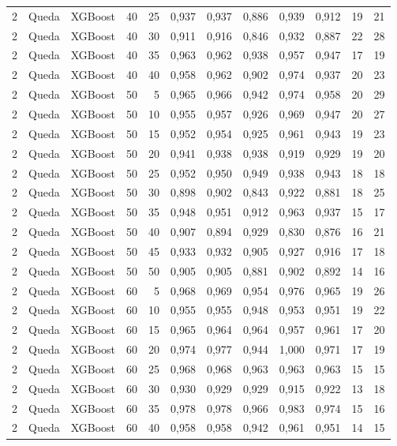\begin{longtable}{@{}rllrrrrrrrrr@{}}
2 & Queda & XGBoost & 40 & 25 & 0,937 & 0,937 & 0,886 & 0,939 & 0,912 & 19 & 21 \\
2 & Queda & XGBoost & 40 & 30 & 0,911 & 0,916 & 0,846 & 0,932 & 0,887 & 22 & 28 \\
2 & Queda & XGBoost & 40 & 35 & 0,963 & 0,962 & 0,938 & 0,957 & 0,947 & 17 & 19 \\
2 & Queda & XGBoost & 40 & 40 & 0,958 & 0,962 & 0,902 & 0,974 & 0,937 & 20 & 23 \\
2 & Queda & XGBoost & 50 & 5 & 0,965 & 0,966 & 0,942 & 0,974 & 0,958 & 20 & 29 \\
2 & Queda & XGBoost & 50 & 10 & 0,955 & 0,957 & 0,926 & 0,969 & 0,947 & 20 & 27 \\
2 & Queda & XGBoost & 50 & 15 & 0,952 & 0,954 & 0,925 & 0,961 & 0,943 & 19 & 23 \\
2 & Queda & XGBoost & 50 & 20 & 0,941 & 0,938 & 0,938 & 0,919 & 0,929 & 19 & 20 \\
2 & Queda & XGBoost & 50 & 25 & 0,952 & 0,950 & 0,949 & 0,938 & 0,943 & 18 & 18 \\
2 & Queda & XGBoost & 50 & 30 & 0,898 & 0,902 & 0,843 & 0,922 & 0,881 & 18 & 25 \\
2 & Queda & XGBoost & 50 & 35 & 0,948 & 0,951 & 0,912 & 0,963 & 0,937 & 15 & 17 \\
2 & Queda & XGBoost & 50 & 40 & 0,907 & 0,894 & 0,929 & 0,830 & 0,876 & 16 & 21 \\
2 & Queda & XGBoost & 50 & 45 & 0,933 & 0,932 & 0,905 & 0,927 & 0,916 & 17 & 18 \\
2 & Queda & XGBoost & 50 & 50 & 0,905 & 0,905 & 0,881 & 0,902 & 0,892 & 14 & 16 \\
2 & Queda & XGBoost & 60 & 5 & 0,968 & 0,969 & 0,954 & 0,976 & 0,965 & 19 & 26 \\
2 & Queda & XGBoost & 60 & 10 & 0,955 & 0,955 & 0,948 & 0,953 & 0,951 & 19 & 22 \\
2 & Queda & XGBoost & 60 & 15 & 0,965 & 0,964 & 0,964 & 0,957 & 0,961 & 17 & 20 \\
2 & Queda & XGBoost & 60 & 20 & 0,974 & 0,977 & 0,944 & 1,000 & 0,971 & 17 & 19 \\
2 & Queda & XGBoost & 60 & 25 & 0,968 & 0,968 & 0,963 & 0,963 & 0,963 & 15 & 15 \\
2 & Queda & XGBoost & 60 & 30 & 0,930 & 0,929 & 0,929 & 0,915 & 0,922 & 13 & 18 \\
2 & Queda & XGBoost & 60 & 35 & 0,978 & 0,978 & 0,966 & 0,983 & 0,974 & 15 & 16 \\
2 & Queda & XGBoost & 60 & 40 & 0,958 & 0,958 & 0,942 & 0,961 & 0,951 & 14 & 15 \\

\end{longtable}
